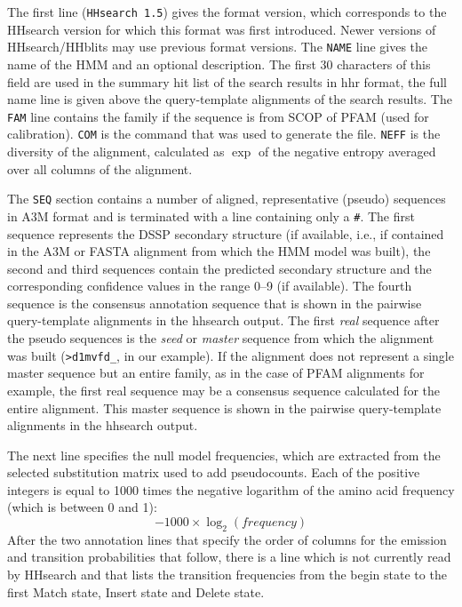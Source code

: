 \documentclass[11pt,a4paper]{article}
\begin{document}
The first line (\verb`HHsearch 1.5`) gives the format version, which corresponds to the HHsearch version for which this format was first introduced. Newer versions of HHsearch/HHblits may use previous format versions. The \verb`NAME` line gives the name of the HMM and an optional description. The first 30 characters of this field are used in the summary hit list of the search results in hhr format, the full name line is given above the query-template alignments of the search results. The \verb`FAM` line contains the family if the sequence is from SCOP of PFAM (used for calibration). \verb`COM` is the command that was used to generate the file. \verb`NEFF` is the diversity of the alignment, calculated as $\exp$ of the negative entropy averaged over all columns of the alignment. 

The \verb`SEQ` section contains a number of aligned, representative (pseudo) sequences in A3M format and is terminated with a line containing only a \verb`#`. The first sequence represents the DSSP secondary structure (if available, i.e., if contained in the A3M or FASTA alignment from which the HMM model was built), the second and third sequences contain the predicted secondary structure and the corresponding confidence values in the range 0--9 (if available). The fourth sequence is the consensus annotation sequence that is shown in the pairwise query-template alignments in the hhsearch output. The first \emph{real} sequence after the pseudo sequences is the \emph{seed} or \emph{master} sequence from which the alignment was built (\verb`>d1mvfd_`, in our example). If the alignment does not represent a single master sequence but an entire family, as in the case of PFAM alignments for example, the first real sequence may be a consensus sequence calculated for the entire alignment. This master sequence is shown in the pairwise query-template alignments in the hhsearch output. 

The next line specifies the null model frequencies, which are extracted from the selected substitution matrix used to add pseudocounts. Each of the positive integers is equal to 1000 times the negative logarithm of the amino acid frequency (which is between 0 and 1):
\begin{equation}
  -1000 \times \log_2( frequency)
  \label{transformation}
\end{equation}
 After the two annotation lines that specify the order of columns for the emission and transition probabilities that follow, there is a line which is not currently read by HHsearch and that lists the transition frequencies from the begin state to the first Match state, Insert state and Delete state.
\end{document}
